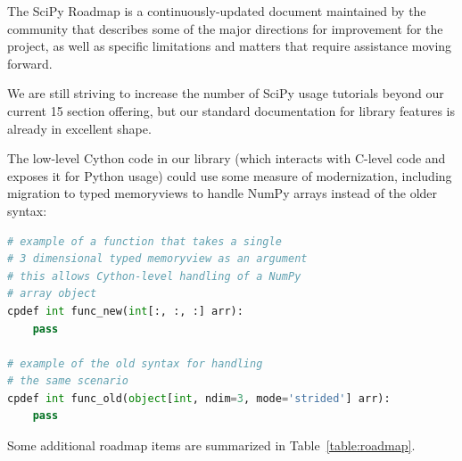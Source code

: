 \documentclass[fleqn,10pt]{wlscirep}
\begin{document}
The SciPy Roadmap\cite{SciPy_roadmap_1,SciPy_roadmap_dev} is a
continuously-updated document
maintained by the community that describes some of the major directions for
improvement for the project, as well as specific limitations and matters that
require assistance moving forward.

We are still striving to increase the number of SciPy usage tutorials beyond
our current 15 section offering\cite{SciPy_tutorials}, but our standard
documentation for library features is already in excellent shape.

The low-level Cython code in our library (which interacts with C-level code and
exposes it for Python usage) could use some measure of modernization, including
migration to typed memoryviews to handle NumPy arrays instead of the older
syntax:

\begin{lstlisting}[language=Python]
# example of a function that takes a single
# 3 dimensional typed memoryview as an argument
# this allows Cython-level handling of a NumPy
# array object
cpdef int func_new(int[:, :, :] arr):
    pass

# example of the old syntax for handling
# the same scenario
cpdef int func_old(object[int, ndim=3, mode='strided'] arr):
    pass
\end{lstlisting}

Some additional roadmap items are summarized in Table~\ref{table:roadmap}.
\end{document}
